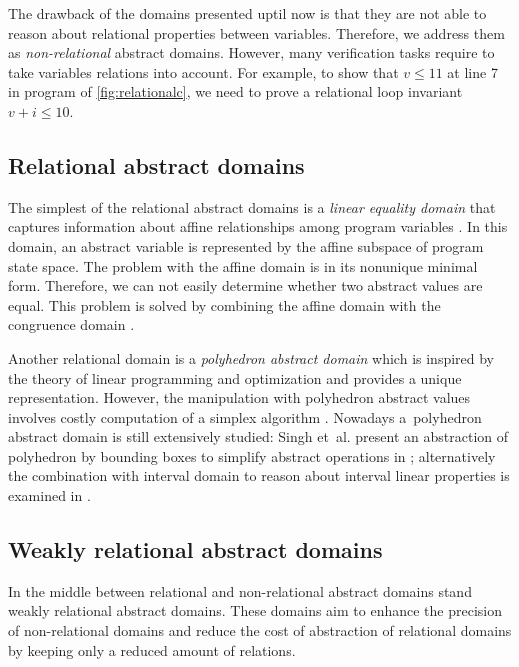 The drawback of the domains presented uptil now is that they are not able to reason about
relational properties between variables. Therefore, we address them as
\emph{non-relational} abstract domains.  However, many verification tasks
require to take variables relations into account.  For example, to show that $v \leq 11$
at line 7 in program of \autoref{fig:relationalc}, we need to prove a
relational loop invariant $v + i
\leq 10$.


\subsection{Relational abstract domains}

The simplest of the relational abstract domains is a \emph{linear equality
domain} that captures information about affine relationships among program
variables \cite{Karr1976}. In this domain, an abstract variable is represented
by the affine subspace of program state space. The problem with the affine
domain is in its nonunique minimal form. Therefore, we can not easily determine
whether two abstract values are equal. This problem is solved by combining
the affine domain with the congruence domain \cite{Granger1991}.

Another relational domain is a \emph{polyhedron abstract domain} which is
inspired by the theory of linear programming and optimization \cite{Cousot1978, Venet2012}
and provides a unique representation. However, the manipulation with polyhedron
abstract values involves costly computation of a simplex algorithm
\cite{Schrijver1986}. Nowadays a~polyhedron abstract domain is still
extensively studied: Singh et~al. present an abstraction of polyhedron by
bounding boxes to simplify abstract operations in \cite{Singh2017};
alternatively the combination with interval domain to reason about interval
linear properties is examined in \cite{Chen2009}.

\subsection{Weakly relational abstract domains}

In the middle between relational and non-relational abstract domains stand
weakly relational abstract domains. These domains aim to enhance the precision
of non-relational domains and reduce the cost of abstraction of relational
domains by keeping only a reduced amount of relations.

